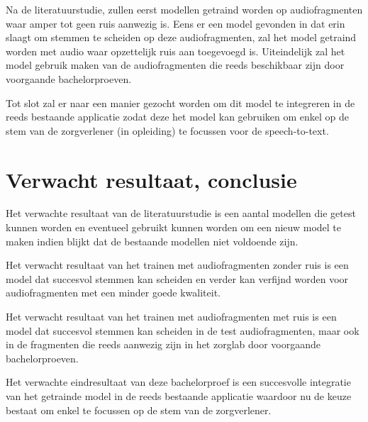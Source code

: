 Na de literatuurstudie, zullen eerst modellen getraind worden op audiofragmenten waar amper tot geen ruis aanwezig is. Eens er een model gevonden in dat erin slaagt om stemmen te scheiden op deze audiofragmenten, zal het model getraind worden met audio waar opzettelijk ruis aan toegevoegd is. Uiteindelijk zal het model gebruik maken van de audiofragmenten die reeds beschikbaar zijn door voorgaande bachelorproeven.

Tot slot zal er naar een manier gezocht worden om dit model te integreren in de reeds bestaande applicatie zodat deze het model kan gebruiken om enkel op de stem van de zorgverlener (in opleiding) te focussen voor de speech-to-text.

\section{Verwacht resultaat, conclusie}%
\label{sec:verwachte_resultaten}

Het verwachte resultaat van de literatuurstudie is een aantal modellen die getest kunnen worden en eventueel gebruikt kunnen worden om een nieuw model te maken indien blijkt dat de bestaande modellen niet voldoende zijn.

Het verwacht resultaat van het trainen met audiofragmenten zonder ruis is een model dat succesvol stemmen kan scheiden en verder kan verfijnd worden voor audiofragmenten met een minder goede kwaliteit.

Het verwacht resultaat van het trainen met audiofragmenten met ruis is een model dat succesvol stemmen kan scheiden in de test audiofragmenten, maar ook in de fragmenten die reeds aanwezig zijn in het zorglab door voorgaande bachelorproeven.

Het verwachte eindresultaat van deze bachelorproef is een succesvolle integratie van het getrainde model in de reeds bestaande applicatie waardoor nu de keuze bestaat om enkel te focussen op de stem van de zorgverlener.
